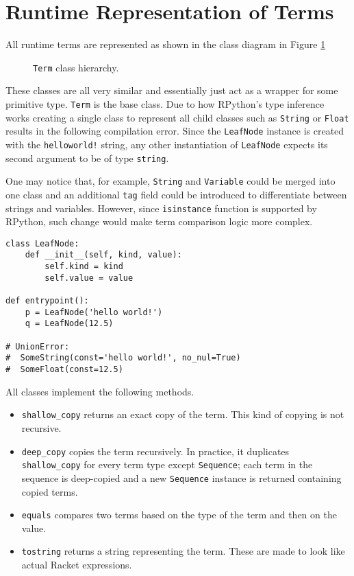 \section{Runtime Representation of Terms}
\label{section:runtime-terms}

All runtime terms are represented as shown in the class diagram in Figure \ref{class-diagram-runtime-term}

\begin{figure}[H]
	\centering
\caption{\texttt{Term} class hierarchy.}
\label{class-diagram-runtime-term}
\end{figure}

These classes are all very similar and essentially just act as a wrapper for some primitive type. \texttt{Term} is the base class. Due to how RPython's type inference works creating a single class to represent all child classes such as \texttt{String} or \texttt{Float} results in the following compilation error.  Since the \texttt{LeafNode} instance is created with the \texttt{helloworld!} string, any other instantiation of \texttt{LeafNode} expects its second argument to be of type \texttt{string}. 

One may notice that, for example, \texttt{String} and \texttt{Variable} could be merged into one class and an additional \texttt{tag} field could be introduced to differentiate between strings and variables. However, since \texttt{isinstance} function is supported by RPython, such change would make term comparison logic more complex.

\begin{verbatim}
class LeafNode:
    def __init__(self, kind, value):
        self.kind = kind 
        self.value = value

def entrypoint():
    p = LeafNode('hello world!')
    q = LeafNode(12.5)

# UnionError:
#  SomeString(const='hello world!', no_nul=True)
#  SomeFloat(const=12.5)
\end{verbatim}

All classes implement the following methods.
\begin{itemize}
\item \texttt{shallow\_copy} returns an exact copy of the term. This kind of copying is not recursive.
\item
\texttt{deep\_copy} copies the term recursively. In practice, it duplicates \texttt{shallow\_copy} for every term type except \texttt{Sequence}; each term in the sequence is deep-copied and a new \texttt{Sequence} instance is returned containing copied terms.
\item
\texttt{equals} compares two terms based on the type of the term and then on the value.
\item
\texttt{tostring} returns a string representing the term. These are made to look like actual Racket expressions.
\end{itemize}
 
